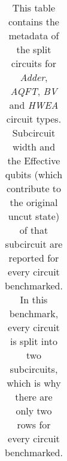 \begin{table}[!htbp]
{\begin{tabular}{|c|ll|ll|ll|ll|}
\end{tabular}%
}
\caption{This table contains the metadata of the split circuits for \textit{Adder}, \textit{AQFT}, \textit{BV} and \textit{HWEA} circuit types. Subcircuit width and the Effective qubits (which contribute to the original uncut state) of that subcircuit are reported for every circuit benchmarked. In this benchmark, every circuit is split into two subcircuits, which is why there are only two rows for every circuit benchmarked.}
\label{tab:results/subcirc-metadata-1}
\end{table}



\begin{table}[!htbp]
\caption{This table contains the metadata of the split circuits for \textit{Supremacy} circuit type. Subcircuit width and the Effective qubits (which contribute to the original uncut state) of each subcircuit are reported for every circuit benchmarked. In this benchmark, every circuit is split into two subcircuits, which is why there are only two rows for every circuit benchmarked.}
\label{tab:results/subcirc-metadata-2}
\end{table}


